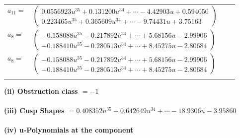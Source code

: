 \documentclass[1p]{elsarticle_modified}
\theoremstyle{definition}
\begin{document}
\begin{tabular}{m{7pt} m{180pt} m{7pt} m{180pt} }
\flushright $a_{11}=$&$\begin{pmatrix}0.0556923 u^{35}+0.131200 u^{34}+\cdots-4.42903 u+0.594050\\0.223465 u^{35}+0.365609 u^{34}+\cdots-9.74431 u+3.75163\end{pmatrix}$ \\
\flushright $a_{8}=$&$\begin{pmatrix}-0.158088 u^{35}-0.217892 u^{34}+\cdots+5.68156 u-2.99906\\-0.188410 u^{35}-0.280513 u^{34}+\cdots+8.45275 u-2.80684\end{pmatrix}$\\ \flushright $a_{8}=$&$\begin{pmatrix}-0.158088 u^{35}-0.217892 u^{34}+\cdots+5.68156 u-2.99906\\-0.188410 u^{35}-0.280513 u^{34}+\cdots+8.45275 u-2.80684\end{pmatrix}$\\&\end{tabular}
\flushleft \textbf{(ii) Obstruction class $= -1$}\\~\\
\flushleft \textbf{(iii) Cusp Shapes $= 0.408352 u^{35}+0.642649 u^{34}+\cdots-18.9306 u-3.95860$}\\~\\
\newpage\renewcommand{\arraystretch}{1}
\flushleft \textbf{(iv) u-Polynomials at the component}\newline \\
\end{document}
